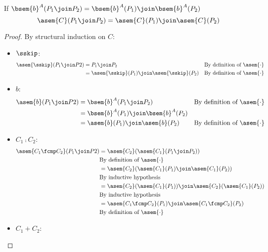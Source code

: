 \begin{theorem} $\;$\\
  \label{thm:additivity}
  If $\bsem{b}^A(P_1 \join P_2) = \bsem{b}^A(P_1) \join \bsem{b}^A(P_2)$
  $$\asem{C}(P_1 \join P_2) = \asem{C}(P_1) \join \asem{C}(P_2)$$
\end{theorem}
\begin{proof}
  By structural induction on $C$:
  \begin{itemize}
    \item $\sskip$:
      \begin{align*}
        \asem{\sskip}(P_1 \join P2)
          &= P_1 \join P_2 
          &\text{By definition of $\asem{\cdot}$} \\
          &= \asem{\sskip}(P_1) \join \asem{\sskip}(P_2)
          &\text{By definition of $\asem{\cdot}$} \\
      \end{align*}
    \item $b$:
      \begin{align*}
        \asem{b}(P_1 \join P2)
          &= \bsem{b}^A(P_1 \join P_2)
          &\text{By definition of $\asem{\cdot}$} \\
          &= \bsem{b}^A(P_1) \join \bsem{b}^A(P_2) \\
          &= \asem{b}(P_1) \join \asem{b}(P_2)
          &\text{By definition of $\asem{\cdot}$} \\
      \end{align*}
    \item $C_1 \fcmp C_2$:
      \begin{align*}
        \asem{C_1 \fcmp C_2}(P_1 \join P2)
          &= \asem{C_2}(\asem{C_1}(P_1 \join P_2)) \\
          &\text{By definition of $\asem{\cdot}$} \\
          &= \asem{C_2}(\asem{C_1}(P_1) \join \asem{C_1}(P_2)) \\
          &\text{By inductive hypothesis} \\
          &= \asem{C_2}(\asem{C_1}(P_1)) \join \asem{C_2}(\asem{C_1}(P_2)) \\
          &\text{By inductive hypothesis} \\
          &= \asem{C_1 \fcmp C_2}(P_1) \join \asem{C_1 \fcmp C_2}(P_2) \\
          &\text{By definition of $\asem{\cdot}$} \\
      \end{align*}
    \item $C_1 + C_2$:

\end{itemize}
\end{proof}
